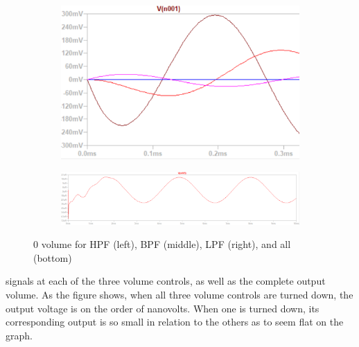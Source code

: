 \documentclass[notitlepage, 12pt]{report}
\begin{document}
\begin{enumerate}
\begin{figure}
\begin{subfigure}{0.3\textwidth}
        \end{subfigure}
        \begin{subfigure}{0.3\textwidth}
            \includegraphics[scale=0.5]{images/volume110.png}
        \end{subfigure} 
        
        \begin{subfigure}{\textwidth}
            \centering
            \includegraphics[width=0.6\linewidth]{images/volume000.png}
        \end{subfigure}
    
        \caption{0 volume for HPF (left), BPF (middle), LPF (right), and all (bottom)}
        \label{fig:spicevolume}
    \end{figure}
    signals at each of the three volume controls, as well as the complete output volume. 
    As the figure shows, when all three volume controls are turned down, the output 
    voltage is on the order of nanovolts. When one is turned down, its corresponding 
    output is so small in relation to the others as to seem flat on the graph. 
\end{enumerate}
\end{document}
